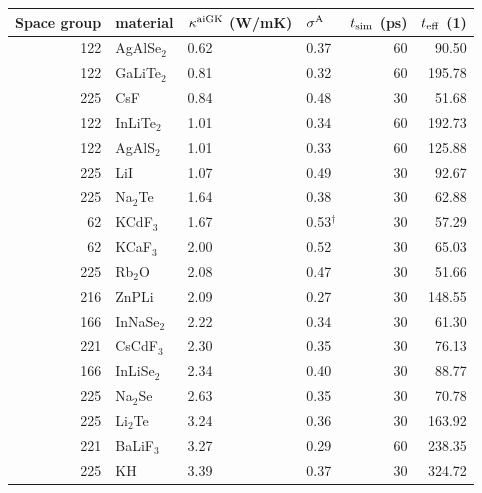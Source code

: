 \begin{table}[ht]
  \centering
  \selectfont
\begin{tabularx}{\linewidth}{rXXXrr}
\toprule
Space group  &    material & $\kappa^{\rm aiGK}$ (W/mK) & $\sigma^\mathrm{A}$  & $t_{\rm sim}$ (ps)  & $t_{\rm eff}$ (1) \\
\midrule
         122 & AgAlSe$_2$ &             0.62 &       0.37 &         60 &      90.50 \\
         122 & GaLiTe$_2$ &             0.81 &       0.32 &         60 &     195.78 \\
         225 &        CsF &             0.84 &       0.48 &         30 &      51.68 \\
         122 & InLiTe$_2$ &             1.01 &       0.34 &         60 &     192.73 \\
         122 &  AgAlS$_2$ &             1.01 &       0.33 &         60 &     125.88 \\
         225 &        LiI &             1.07 &       0.49 &         30 &      92.67 \\
         225 &   Na$_2$Te &             1.64 &       0.38 &         30 &      62.88 \\
          62 &   KCdF$_3$ &             1.67 & 0.53$^\dagger$ &     30 &      57.29 \\
          62 &   KCaF$_3$ &             2.00 &       0.52 &         30 &      65.03 \\
         225 &    Rb$_2$O &             2.08 &       0.47 &         30 &      51.66 \\
         216 &      ZnPLi &             2.09 &       0.27 &         30 &     148.55 \\
         166 & InNaSe$_2$ &             2.22 &       0.34 &         30 &      61.30 \\
         221 &  CsCdF$_3$ &             2.30 &       0.35 &         30 &      76.13 \\
         166 & InLiSe$_2$ &             2.34 &       0.40 &         30 &      88.77 \\
         225 &   Na$_2$Se &             2.63 &       0.35 &         30 &      70.78 \\
         225 &   Li$_2$Te &             3.24 &       0.36 &         30 &     163.92 \\
         221 &  BaLiF$_3$ &             3.27 &       0.29 &         60 &     238.35 \\
         225 &         KH &             3.39 &       0.37 &         30 &     324.72 \\

\end{tabularx}
\end{table}
